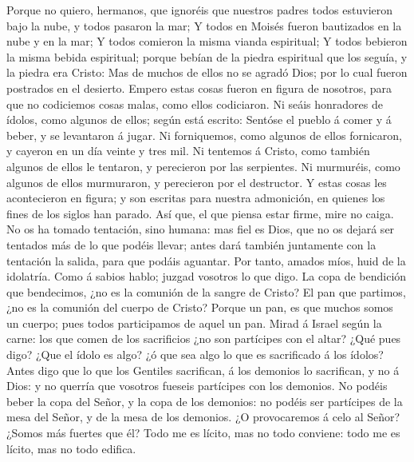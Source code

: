 Porque no quiero, hermanos, que ignoréis que nuestros
padres todos estuvieron bajo la nube, y todos pasaron la mar;
 Y todos en Moisés fueron bautizados en la nube y en la
mar;  Y todos comieron la misma vianda espiritual;
 Y todos bebieron la misma bebida espiritual; porque
bebían de la piedra espiritual que los seguía, y la piedra era Cristo:
 Mas de muchos de ellos no se agradó Dios; por lo cual
fueron postrados en el desierto.  Empero estas cosas
fueron en figura de nosotros, para que no codiciemos cosas malas, como
ellos codiciaron.  Ni seáis honradores de ídolos, como
algunos de ellos; según está escrito: Sentóse el pueblo á comer y á
beber, y se levantaron á jugar.  Ni forniquemos, como
algunos de ellos fornicaron, y cayeron en un día veinte y tres mil.
 Ni tentemos á Cristo, como también algunos de ellos le
tentaron, y perecieron por las serpientes.  Ni murmuréis,
como algunos de ellos murmuraron, y perecieron por el destructor.
 Y estas cosas les acontecieron en figura; y son escritas
para nuestra admonición, en quienes los fines de los siglos han parado.
 Así que, el que piensa estar firme, mire no caiga.
 No os ha tomado tentación, sino humana: mas fiel es
Dios, que no os dejará ser tentados más de lo que podéis llevar; antes
dará también juntamente con la tentación la salida, para que podáis
aguantar.  Por tanto, amados míos, huid de la idolatría.
 Como á sabios hablo; juzgad vosotros lo que digo.
 La copa de bendición que bendecimos, ¿no es la comunión
de la sangre de Cristo? El pan que partimos, ¿no es la comunión del
cuerpo de Cristo?  Porque un pan, es que muchos somos un
cuerpo; pues todos participamos de aquel un pan.  Mirad á
Israel según la carne: los que comen de los sacrificios ¿no son
partícipes con el altar?  ¿Qué pues digo? ¿Que el ídolo
es algo? ¿ó que sea algo lo que es sacrificado á los ídolos?
 Antes digo que lo que los Gentiles sacrifican, á los
demonios lo sacrifican, y no á Dios: y no querría que vosotros fueseis
partícipes con los demonios.  No podéis beber la copa del
Señor, y la copa de los demonios: no podéis ser partícipes de la mesa
del Señor, y de la mesa de los demonios.  ¿O provocaremos
á celo al Señor? ¿Somos más fuertes que él?  Todo me es
lícito, mas no todo conviene: todo me es lícito, mas no todo edifica.
